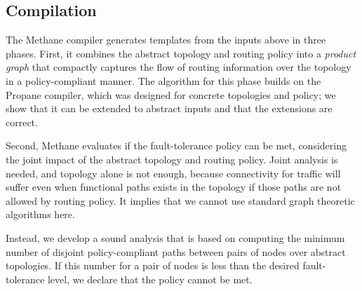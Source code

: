 \documentclass[numbers, 10pt, preprint]{sigplanconf}
\newcommand{\sysname}{{\small \sf Methane}\xspace}
\begin{document}
\subsection{Compilation}


The \sysname compiler generates templates from the inputs above in three phases. First, it combines the abstract topology and routing policy into a {\em product graph} that compactly captures the flow of routing information over the topology in a policy-compliant manner. The algorithm for this phase builds on the Propane compiler, which was designed for concrete topologies and policy; we show that it can be extended to abstract inputs and that the extensions are correct.

Second, \sysname evaluates if the fault-tolerance policy can be met, considering the joint impact of the abstract topology and routing policy. Joint analysis is needed, and topology alone is not enough, because connectivity for traffic will suffer even when functional paths exists in the topology if those paths are not allowed by routing policy. It implies that we cannot use standard graph theoretic algorithms here.

Instead, we develop a sound analysis that is based on computing the minimum number of disjoint policy-compliant paths between pairs of nodes over abstract topologies. If this number for a pair of nodes is less than the desired fault-tolerance level, we declare that the policy cannot be met.
\end{document}
